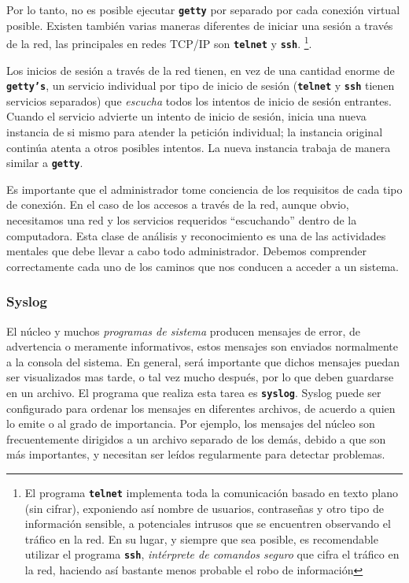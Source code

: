 \documentclass[12pt]{article}
\begin{document}
Por lo tanto, no es posible ejecutar \texttt{\textbf{getty}} por separado 
por cada conexión virtual posible. Existen
también varias maneras diferentes de iniciar una sesión a través de la red, las
principales en redes TCP/IP son \texttt{\textbf{telnet}} y \texttt{\textbf{ssh}}.
\footnote{El programa \texttt{\textbf{telnet}} implementa toda la comunicación basado en
texto plano (sin cifrar), exponiendo así nombre de usuarios, contraseñas y otro tipo de 
información sensible, a potenciales intrusos que se encuentren observando el tráfico en la red. 
En su lugar, y siempre que sea posible, es recomendable utilizar el programa \texttt{\textbf{ssh}}, 
\textit{intérprete de comandos seguro} que cifra el tráfico en la red, haciendo
así bastante menos probable el robo de información}.


 Los inicios de sesión a través de la red tienen, en vez de una cantidad
enorme de \texttt{\textbf{getty's}}, un servicio individual por tipo de 
inicio de sesión (\texttt{\textbf{telnet}} y \texttt{\textbf{ssh}}
tienen servicios separados) que \textit{escucha} todos los intentos de inicio de
sesión entrantes. Cuando el servicio advierte un intento de inicio de sesión,
inicia una nueva instancia de si mismo para atender la petición individual; la
instancia original continúa atenta a otros posibles intentos. La nueva instancia
trabaja de manera similar a \texttt{\textbf{getty}}.

Es importante que el administrador tome conciencia de los requisitos de cada tipo 
de conexión. En el caso de los accesos a través de la red, aunque obvio, necesitamos
una red y los servicios requeridos ``escuchando'' dentro de la computadora. Esta
clase de análisis y reconocimiento es una de las actividades mentales que debe
llevar a cabo todo administrador. Debemos comprender correctamente cada uno de los 
caminos que nos conducen a acceder a un sistema.   

\subsubsection{Syslog}

 El núcleo y muchos \textit{programas de sistema} producen mensajes de 
error, de advertencia o meramente informativos, estos mensajes son enviados
normalmente a la consola del sistema. En general, será importante que 
dichos mensajes puedan ser visualizados mas tarde, o tal vez mucho 
después, por lo que deben guardarse en un archivo. El programa que realiza
esta tarea es \texttt{\textbf{syslog}}. Syslog puede ser configurado para
ordenar los mensajes en diferentes archivos, de acuerdo a quien lo emite o 
al grado de importancia.  Por ejemplo, los mensajes del núcleo son 
frecuentemente dirigidos a un archivo separado de los demás, debido a que
son más importantes, y necesitan ser leídos regularmente para detectar 
problemas.  
\end{document}
